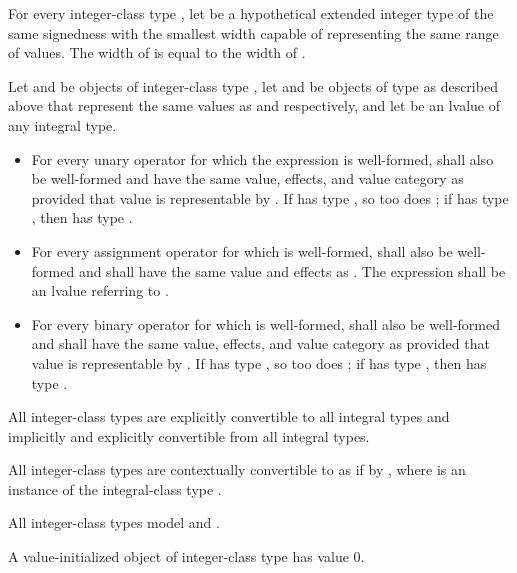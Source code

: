 \pnum
For every integer-class type ,
let  be a hypothetical extended integer type
of the same signedness with the smallest width
capable of representing the same range of values.
The width of  is equal to the width of .

\pnum
Let  and  be objects of integer-class type ,
let  and  be objects of type  as described above
that represent the same values as  and  respectively, and
let  be an lvalue of any integral type.
\begin{itemize}
\item
  For every unary operator  for which the expression 
  is well-formed,  shall also be well-formed
  and have the same value, effects, and value category as 
  provided that value is representable by .
  If  has type , so too does ;
  if  has type , then  has type .
\item
  For every assignment operator 
  for which  is well-formed,
   shall also be well-formed and
  shall have the same value and effects as .
  The expression  shall be an lvalue referring to .
\item
  For every binary operator  for which  is well-formed,
   shall also be well-formed and
  shall have the same value, effects, and value category as 
  provided that value is representable by .
  If  has type , so too does ;
  if  has type , then  has type .
\end{itemize}

\pnum
All integer-class types are explicitly convertible to all integral types and
implicitly and explicitly convertible from all integral types.

\pnum
All integer-class types are contextually convertible to 
as if by , where  is an
instance of the integral-class type .

\pnum
All integer-class types model
 and
.

\pnum
A value-initialized object of integer-class type has value 0.

